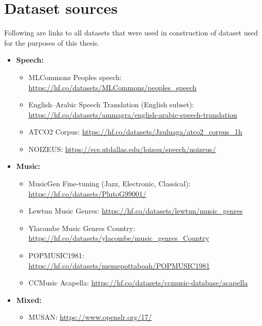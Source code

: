 \chapter{Dataset sources}
\label{apx:dataset_sources}
Following are links to all datasets that were used in construction of dataset used for the purposes of this thesis.

\begin{itemize}
    \item \textbf{Speech:}
    \begin{itemize}
        \item MLCommons Peoples speech: \url{https://hf.co/datasets/MLCommons/peoples_speech}
        \item English--Arabic Speech Translation (English subset): \url{https://hf.co/datasets/ammagra/english-arabic-speech-translation}
        \item ATCO2 Corpus: \url{https://hf.co/datasets/Jzuluaga/atco2_corpus_1h}
        \item NOIZEUS: \url{https://ecs.utdallas.edu/loizou/speech/noizeus/}
    \end{itemize}

    \item \textbf{Music:}
    \begin{itemize}
        \item MusicGen Fine-tuning (Jazz, Electronic, Classical): \url{https://hf.co/datasets/PlutoG99001/}
        \item Lewtun Music Genres: \url{https://hf.co/datasets/lewtun/music_genres}
        \item Ylacombe Music Genres Country: \url{https://hf.co/datasets/ylacombe/music_genres_Country}
        \item POPMUSIC1981: \url{https://hf.co/datasets/memepottaboah/POPMUSIC1981}
        \item CCMusic Acapella: \url{https://hf.co/datasets/ccmusic-database/acapella}
    \end{itemize}

    \item \textbf{Mixed:}
    \begin{itemize}
        \item MUSAN: \url{https://www.openslr.org/17/}
    \end{itemize}
\end{itemize}